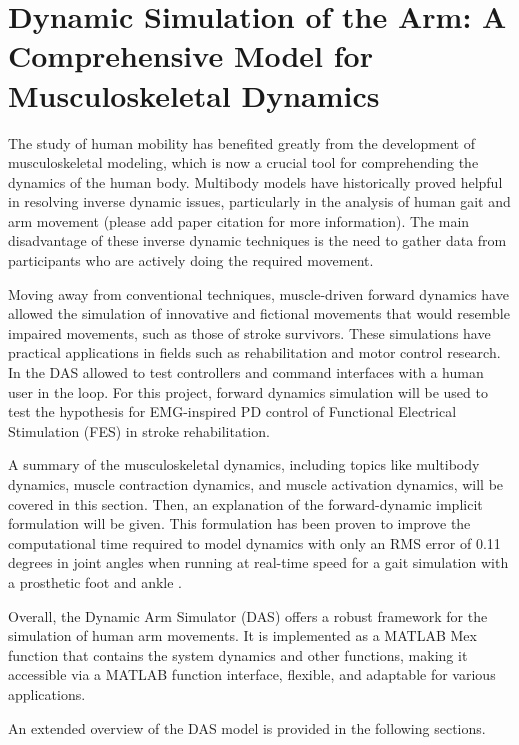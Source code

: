\section{Dynamic Simulation of the Arm: A Comprehensive Model for Musculoskeletal Dynamics}
The study of human mobility has benefited greatly from the development of musculoskeletal modeling, which is now a crucial tool for comprehending the dynamics of the human body. Multibody models have historically proved helpful in resolving inverse dynamic issues, particularly in the analysis of human gait and arm movement (please add paper citation for more information). The main disadvantage of these inverse dynamic techniques is the need to gather data from participants who are actively doing the required movement.

Moving away from conventional techniques, muscle-driven forward dynamics have allowed the simulation of innovative and fictional movements that would resemble impaired movements, such as those of stroke survivors. These simulations have practical applications in fields such as rehabilitation and motor control research. In \cite{IMP} the DAS allowed to test controllers and command interfaces with a human user in the loop. For this project, forward dynamics simulation will be used to test the hypothesis for EMG-inspired PD control of Functional Electrical Stimulation (FES) in stroke rehabilitation. 

A summary of the musculoskeletal dynamics, including topics like multibody dynamics, muscle contraction dynamics, and muscle activation dynamics, will be covered in this section. Then, an explanation of the forward-dynamic implicit formulation will be given. This formulation has been proven to improve the computational time required to model dynamics with only an RMS error of 0.11 degrees in joint angles when running at real-time speed for a gait simulation with a prosthetic foot and ankle \cite{IMP}.

Overall, the Dynamic Arm Simulator (DAS) offers a robust framework for the simulation of human arm movements. It is implemented as a MATLAB Mex function that contains the system dynamics and other functions, making it accessible via a MATLAB function interface, flexible, and adaptable for various applications. 

An extended overview of the DAS model is provided in the following sections.

